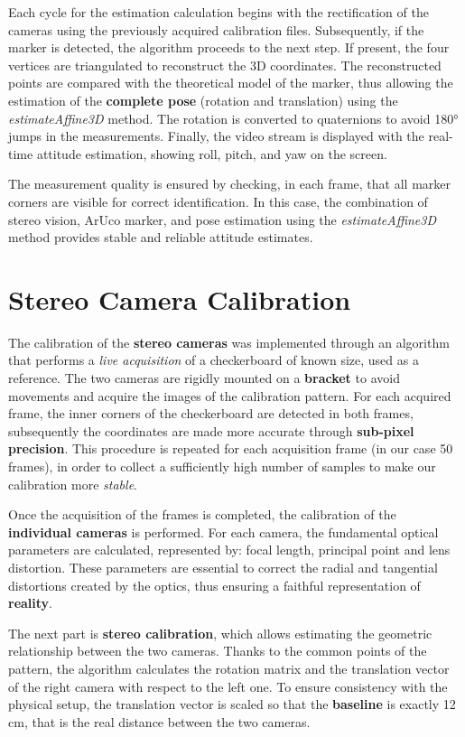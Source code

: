 Each cycle for the estimation calculation begins with the rectification of the cameras using the previously acquired calibration files. Subsequently, if the marker is detected, the algorithm proceeds to the next step. If present, the four vertices are triangulated to reconstruct the 3D coordinates. The reconstructed points are compared with the theoretical model of the marker, thus allowing the estimation of the \textbf{complete pose} (rotation and translation) using the \textit{estimateAffine3D} method. The rotation is converted to quaternions to avoid 180° jumps in the measurements. Finally, the video stream is displayed with the real-time attitude estimation, showing roll, pitch, and yaw on the screen.

The measurement quality is ensured by checking, in each frame, that all marker corners are visible for correct identification. In this case, the combination of stereo vision, ArUco marker, and pose estimation using the \textit{estimateAffine3D} method provides stable and reliable attitude estimates.

\section{Stereo Camera Calibration}
The calibration of the \textbf{stereo cameras} was implemented through an algorithm that performs a \textit{live acquisition} of a checkerboard of known size, used as a reference. The two cameras are rigidly mounted on a \textbf{bracket} to avoid movements and acquire the images of the calibration pattern. For each acquired frame, the inner corners of the checkerboard are detected in both frames, subsequently the coordinates are made more accurate through \textbf{sub-pixel precision}. This procedure is repeated for each acquisition frame (in our case 50 frames), in order to collect a sufficiently high number of samples to make our calibration more \textit{stable}.

Once the acquisition of the frames is completed, the calibration of the \textbf{individual cameras} is performed. For each camera, the fundamental optical parameters are calculated, represented by: focal length, principal point and lens distortion. These parameters are essential to correct the radial and tangential distortions created by the optics, thus ensuring a faithful representation of \textbf{reality}.

The next part is \textbf{stereo calibration}, which allows estimating the geometric relationship between the two cameras. Thanks to the common points of the pattern, the algorithm calculates the rotation matrix and the translation vector of the right camera with respect to the left one. To ensure consistency with the physical setup, the translation vector is scaled so that the \textbf{baseline} is exactly 12 cm, that is the real distance between the two cameras.

